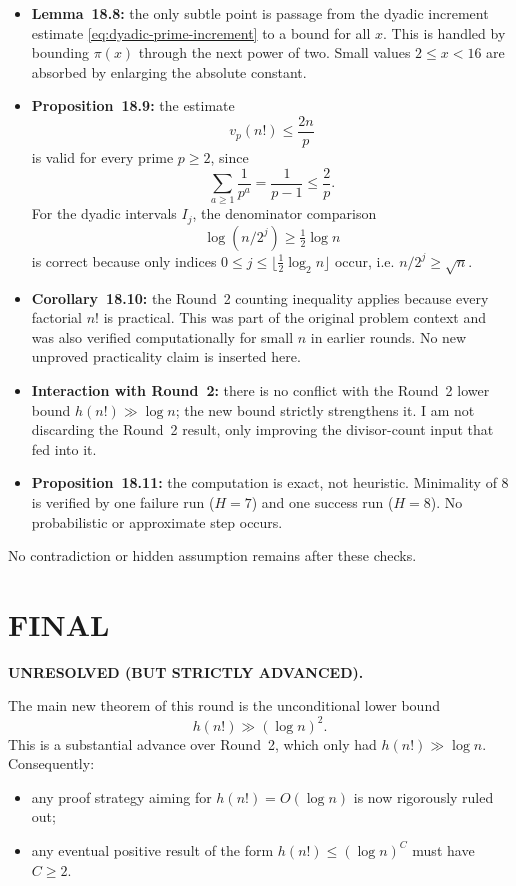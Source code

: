\begin{itemize}
\item \textbf{Lemma~18.8:} the only subtle point is passage from the dyadic increment estimate \eqref{eq:dyadic-prime-increment} to a bound for all \(x\). This is handled by bounding \(\pi(x)\) through the next power of two. Small values \(2\le x<16\) are absorbed by enlarging the absolute constant.

\item \textbf{Proposition~18.9:} the estimate
\[
v_p(n!)\le \frac{2n}{p}
\]
is valid for every prime \(p\ge 2\), since
\[
\sum_{a\ge 1}\frac1{p^a}=\frac1{p-1}\le \frac2p.
\]
For the dyadic intervals \(I_j\), the denominator comparison
\[
\log(n/2^j)\ge \tfrac12\log n
\]
is correct because only indices \(0\le j\le \lfloor \tfrac12\log_2 n\rfloor\) occur, i.e.
\(n/2^j\ge \sqrt n\).

\item \textbf{Corollary~18.10:} the Round~2 counting inequality applies because every factorial \(n!\) is practical. This was part of the original problem context and was also verified computationally for small \(n\) in earlier rounds. No new unproved practicality claim is inserted here.

\item \textbf{Interaction with Round~2:} there is no conflict with the Round~2 lower bound \(h(n!)\gg \log n\); the new bound strictly strengthens it. I am not discarding the Round~2 result, only improving the divisor-count input that fed into it.

\item \textbf{Proposition~18.11:} the computation is exact, not heuristic. Minimality of \(8\) is verified by one failure run (\(H=7\)) and one success run (\(H=8\)). No probabilistic or approximate step occurs.
\end{itemize}

No contradiction or hidden assumption remains after these checks.

\section{FINAL}

\textbf{UNRESOLVED (BUT STRICTLY ADVANCED).}

The main new theorem of this round is the unconditional lower bound
\[
h(n!) \gg (\log n)^2.
\]
This is a substantial advance over Round~2, which only had \(h(n!)\gg \log n\). Consequently:
\begin{itemize}
\item any proof strategy aiming for \(h(n!)=O(\log n)\) is now rigorously ruled out;
\item any eventual positive result of the form \(h(n!)\le (\log n)^C\) must have \(C\ge 2\).
\end{itemize}

